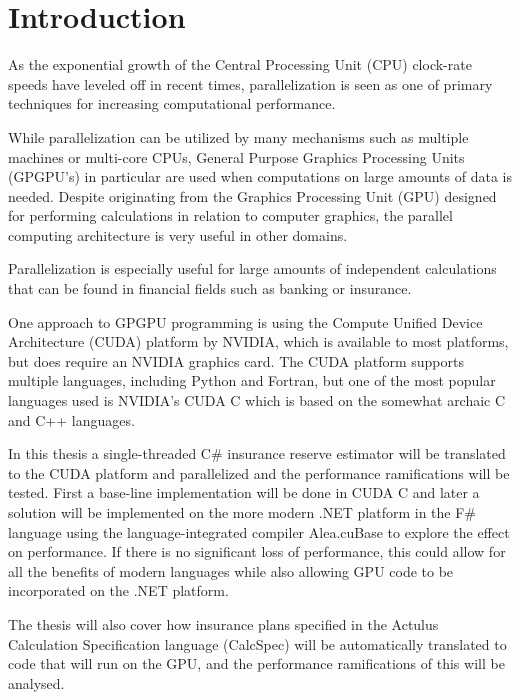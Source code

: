 \section{Introduction}
As the exponential growth of the Central Processing Unit (CPU) clock-rate speeds have leveled off in recent times\cite{ross2008cpu}, parallelization is seen as one of primary techniques for increasing computational performance. %

While parallelization can be utilized by many mechanisms such as multiple machines or multi-core CPUs, General Purpose Graphics Processing Units (GPGPU's) in particular are used when computations on large amounts of data is needed. 
Despite originating from the Graphics Processing Unit (GPU) designed for performing calculations in relation to computer graphics, the parallel computing architecture is very useful in other domains.

Parallelization is especially useful for large amounts of independent calculations that can be found in financial fields such as banking or insurance.

One approach to GPGPU programming is using the Compute Unified Device Architecture (CUDA) platform by NVIDIA, which is available to most platforms, but does require an NVIDIA graphics card.
The CUDA platform supports multiple languages, including Python and Fortran, but one of the most popular languages used is NVIDIA's CUDA C which is based on the somewhat archaic C and C++ languages.

In this thesis a single-threaded C\# insurance reserve estimator will be translated to the CUDA platform and parallelized and the performance ramifications will be tested.
First a base-line implementation will be done in CUDA C and later a solution will be implemented on the more modern .NET platform in the F\# language using the language-integrated compiler Alea.cuBase to explore the effect on performance.
If there is no significant loss of performance, this could allow for all the benefits of modern languages while also allowing GPU code to be incorporated on the .NET platform.


The thesis will also cover how insurance plans specified in the Actulus Calculation Specification language (CalcSpec) will be automatically translated to code that will run on the GPU, and the performance ramifications of this will be analysed.

